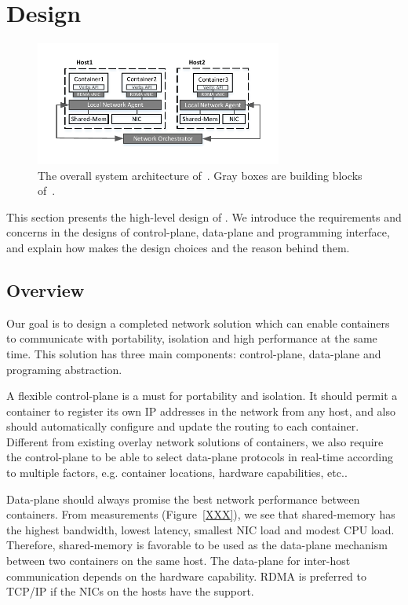 \section{Design} \label{sec:design}

\begin{figure}[t!] 
     \centering 
     \includegraphics[width=3.2in]{figures/system-arch.pdf} 
    \caption{\label{fig:sysarch} The overall system architecture of~\sysname. Gray boxes are building blocks of~\sysname.} 
\end{figure} 

This section presents the high-level design of \sysname. We introduce
the requirements and concerns in the designs of control-plane, data-plane
and programming interface, and explain how \sysname makes the design choices
and the reason behind them.

\subsection{Overview}

Our goal is to design a completed network solution which can enable containers
to communicate with portability, isolation and high performance at the same time.
This solution has three main components: control-plane, data-plane and programing
abstraction. 

A flexible control-plane is a must for portability and isolation. 
It should permit a container to register its own IP addresses in the network
from any host, and also should automatically configure and update the routing 
to each container. Different from existing overlay network solutions of 
containers, we also require the control-plane to be able to select 
data-plane protocols in real-time according to multiple factors, 
e.g. container locations, hardware capabilities, etc..

Data-plane should always promise the best network performance between 
containers. From measurements (Figure~\ref{XXX}), 
we see that shared-memory has the highest
bandwidth, lowest latency, smallest NIC load and modest CPU load. 
Therefore, shared-memory is favorable to be used as the data-plane 
mechanism between two containers on the same host. 
The data-plane for inter-host communication
depends on the hardware capability. RDMA is preferred to TCP/IP if the NICs
on the hosts have the support.

